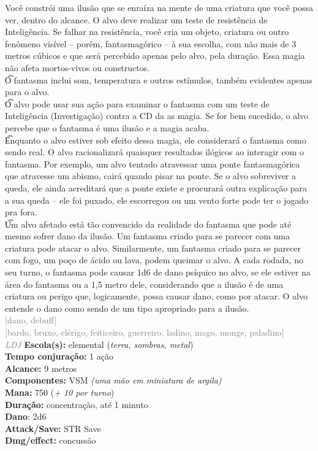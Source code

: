 \documentclass{RPG_Adventure}[2021/10/20]
\begin{document}
{\normalsize Você constrói uma ilusão que se enraíza na mente de uma criatura que você possa ver, dentro do alcance. O alvo deve realizar um teste de resistência de Inteligência. Se falhar na resistência, você cria um objeto, criatura ou outro fenômeno visível – porém, fantasmagórico – à sua escolha, com não mais de 3 metros cúbicos e que será percebido apenas pelo alvo, pela duração. Essa magia não afeta mortos-vivos ou constructos.\\\t O fantasma inclui som, temperatura e outros estímulos, também evidentes apenas para o alvo.\\\t O alvo pode usar sua ação para examinar o fantasma com um teste de Inteligência (Investigação) contra a CD da as magia. Se for bem sucedido, o alvo percebe que o fantasma é uma ilusão e a magia acaba.\\\t Enquanto o alvo estiver sob efeito dessa magia, ele considerará o fantasma como sendo real. O alvo racionalizará quaisquer resultados ilógicos ao interagir com o fantasma. Por exemplo, um alvo tentado atravessar uma ponte fantasmagórica que atravesse um abismo, cairá quando pisar na ponte. Se o alvo sobreviver a queda, ele ainda acreditará que a ponte existe e procurará outra explicação para a sua queda – ele foi puxado, ele escorregou ou um vento forte pode ter o jogado pra fora.\\\t Um alvo afetado está tão convencido da realidade do fantasma que pode até mesmo sofrer dano da ilusão. Um fantasma criado para se parecer com uma criatura pode atacar o alvo. Similarmente, um fantasma criado para se parecer com fogo, um poço de ácido ou lava, podem queimar o alvo. A cada rodada, no seu turno, o fantasma pode causar 1d6 de dano psíquico no alvo, se ele estiver na área do fantasma ou a 1,5 metro dele, considerando que a ilusão é de uma criatura ou perigo que, logicamente, possa causar dano, como por atacar. O alvo entende o dano como sendo de um tipo apropriado para a ilusão.\\}
{\scriptsize \textcolor{gray}{[dano, debuff]\\}}
{\scriptsize \textcolor{gray}{[bardo, bruxo, clérigo, feiticeiro, guerreiro, ladino, mago, monge, paladino]\\}}
{\tiny \textcolor{gray}{\textit{LDJ}}}
{\small \t \textbf{Escola(s):} elemental (\textit{terra, sombras, metal})\\\t \textbf{Tempo conjuração:} 1 ação\\\t \textbf{Alcance:} 9 metros\\\t \textbf{Componentes:} VSM \textit{(uma mão em miniatura de argila)}\\\t \textbf{Mana:} 750 (\textit{+ 10 por turno})\\\t \textbf{Duração:} concentração, até 1 minuto\\\t \textbf{Dano}: 2d6\\\t \textbf{Attack/Save:} STR Save\\\t \textbf{Dmg/effect:} concussão\\}
\end{document}
